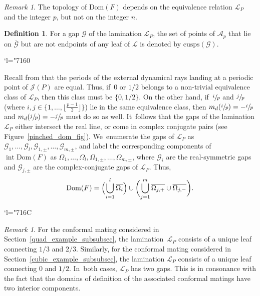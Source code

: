 \documentclass[JEP,XML,SOM,Unicode,NoFloatCountersInSection,published]{cedram}
\newcommand{\Changel}{\mathcode`l="7160}
\newcommand{\Changelback}{\mathcode`l="716C}
\theoremstyle{definition}
\newtheorem{definition}[lemma]{Definition}
\theoremstyle{remark}
\newtheorem{remark}[lemma]{Remark}
\DeclareMathOperator{\Int}{int}
\begin{document}
\begin{remark}
The topology of $\mathrm{Dom}(F)$ depends on the equivalence relation $\mathcal{L}_P$ and the integer $p$, but not on the integer $n$.
\end{remark}

\begin{definition}\label{gap_cusp_def}
For a gap $\mathcal{G}$ of the lamination $\mathcal{L}_P$, the set of points of $\mathcal{A}_p$ that lie on $\overline{\mathcal{G}}$ but are not endpoints of any leaf of $\mathcal{L}$ is denoted by $\mathrm{cusps}(\mathcal{G})$.
\end{definition}

\Changel

Recall from \cite[\S 18]{Mil06} that the periods of the external dynamical rays landing at a periodic point of $\mathcal{J}(P)$ are equal. Thus, if~$0$ or $1/2$ belongs to a non-trivial equivalence class of $\mathcal{L}_P$, then this class must be $\{0,1/2\}$. On the other hand, if~$\sfrac{i}{p}$ and $\sfrac{j}{p}$ (where $i,j\in\{1,\dots,\lfloor \frac{p-1}{2}\rfloor\}$) lie in the same equivalence class, then $m_d(\sfrac{i}{p})=-\sfrac{i}{p}$ and $m_d(\sfrac{j}{p})=-\sfrac{j}{p}$ must do so as well. It~follows that the gaps of the lamination $\mathcal{L}_P$ either intersect the real line, or come in complex conjugate pairs (see Figure~\ref{pinched_dom_fig}). We~enumerate the gaps of $\mathcal{L}_P$ as $\mathcal{G}_1,\dots,\mathcal{G}_l,\mathcal{G}_{1,\pm},\dots,\mathcal{G}_{m,\pm}$, and label the corresponding components of $\Int{\mathrm{Dom}(F)}$ as $\Omega_1,\dots,\Omega_l,\Omega_{1,\pm},\dots,\Omega_{m,\pm}$, where $\mathcal{G}_i$ are the real-symmetric gaps and $\mathcal{G}_{j,\pm}$ are the complex-conjugate gaps of $\mathcal{L}_P$.
Thus,\vspace*{-3pt}\enlargethispage{.5\baselineskip}
\[
\mathrm{Dom}(F)=\Bigl(\bigcup_{i=1}^l\overline{\Omega_i} \Bigr)\cup\biggl(\bigcup_{j=1}^m \overline{\Omega_{j,+}}\cup \overline{\Omega_{j,-}} \biggr).
\]

\Changelback

\begin{remark}\label{examples_lamination_rem}
For the conformal mating considered in Section~\ref{quad_example_subsubsec}, the lamination~$\mathcal{L}_P$ consists of a unique leaf connecting $1/3$ and $2/3$. Similarly, for the conformal mating considered in Section~\ref{cubic_example_subsubsec}, the lamination $\mathcal{L}_P$ consists of a unique leaf connecting $0$ and $1/2$. In~both cases, $\mathcal{L}_P$ has two gaps. This is in consonance with the fact that the domains of definition of the associated conformal matings have two interior components.
\end{remark}
\end{document}
